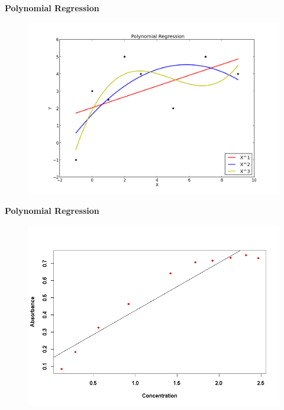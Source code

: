\documentclass{beamer}
\begin{document}
\begin{frame}
	\noindent \textbf{Polynomial Regression}	
	\large
\begin{figure}
\centering
\includegraphics[width=1.1\linewidth]{images/polynomial1}

\end{figure}

	
	
\end{frame}
\begin{frame}
		\noindent \textbf{Polynomial Regression}	
		\large
\begin{figure}
\centering
\includegraphics[width=1.1\linewidth]{images/ExamQ3plot}
\caption{}
\label{fig:ExamQ3plot}
\end{figure}

\end{frame}
\end{document}

